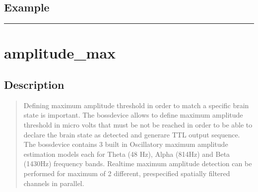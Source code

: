 \documentclass[letterpaper,10pt,english]{sphinxmanual}
\begin{document}
\subsection{Example}
\label{\detokenize{4_api_documentation:id30}}
\begin{sphinxVerbatim}[commandchars=\\\{\}]
\end{sphinxVerbatim}


\bigskip\hrule\bigskip



\section{amplitude\_max}
\label{\detokenize{4_api_documentation:amplitude-max}}

\subsection{Description}
\label{\detokenize{4_api_documentation:id31}}\begin{quote}

\sphinxAtStartPar
Defining maximum amplitude threshold in order to match a specific brain state is important. The bossdevice allows to define maximum amplitude threshold in micro volts that must be not be reached in order to be able to declare the brain state as detected and generare TTL output sequence. The bossdevice contains 3 built in Oscillatory maximum amplitude estimation models each for Theta (4\sphinxhyphen{}8 Hz), Alpha (8\sphinxhyphen{}14Hz) and Beta (14\sphinxhyphen{}30Hz) frequency bands. Real\sphinxhyphen{}time maximum amplitude detection can be performed for maximum of 2 different, pre\sphinxhyphen{}specified spatially filtered channels in parallel.
\end{quote}
\end{document}
